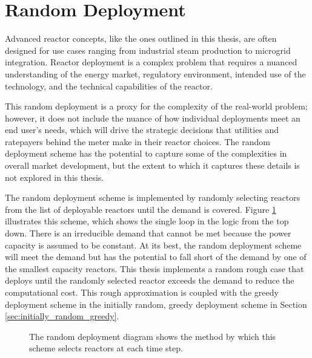 \section{Random Deployment}
\label{sec:random_deployment}

Advanced reactor concepts, like the ones outlined in this thesis, are often
designed for use cases ranging from industrial steam production to microgrid
integration. Reactor deployment is a complex problem that requires a nuanced understanding of the energy market, regulatory environment, intended use of the technology, and the technical capabilities of the reactor.

This random deployment is a proxy for the complexity of the real-world problem; however, it does not include the nuance of how individual
deployments meet an end user's needs, which will drive the strategic decisions
that utilities and ratepayers behind the meter make in their reactor choices.
The random deployment scheme has the potential to capture some of the
complexities in overall market development, but the extent to which it captures these details is not explored in this thesis.

The random deployment scheme is implemented by randomly selecting reactors from the list of deployable reactors until the demand is covered. Figure \ref{fig:random_diagram} illustrates this scheme, which shows the single loop in the logic from the top down. There is an irreducible demand that cannot be met because the power capacity is assumed to be constant. At its best, the random deployment scheme will meet the demand but has the potential to fall short of the demand by one of the smallest capacity reactors. This thesis implements a random rough case that deploys until the randomly selected reactor exceeds the demand to reduce the computational cost. This rough approximation is coupled with the greedy deployment scheme in the initially random, greedy deployment scheme in Section \ref{sec:initially_random_greedy}.

\begin{figure}[H]
  \centering
  \caption{The random deployment diagram shows the method by which this scheme selects reactors at each time step.}
  \label{fig:random_diagram}
\end{figure}

